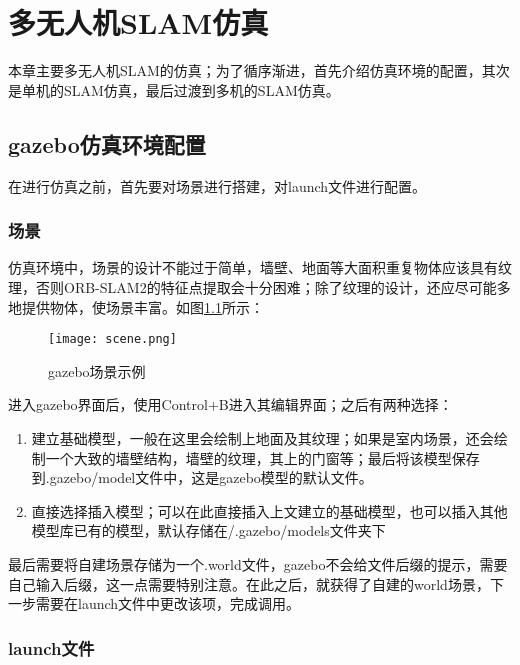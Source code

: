 \renewcommand{\baselinestretch}{1.5}
\fontsize{12pt}{13pt}\selectfont

\chapter{多无人机SLAM仿真} \label{Simulation}

本章主要多无人机SLAM的仿真；为了循序渐进，首先介绍仿真环境的配置，其次是单机的SLAM仿真，最后过渡到多机的SLAM仿真。


\section{gazebo仿真环境配置}

在进行仿真之前，首先要对场景进行搭建，对launch文件进行配置。

\subsection{场景} \label{4.1.1}

仿真环境中，场景的设计不能过于简单，墙壁、地面等大面积重复物体应该具有纹理，否则ORB-SLAM2的特征点提取会十分困难；除了纹理的设计，还应尽可能多地提供物体，使场景丰富。如图\ref{fig4-1}所示：
~\\
\begin{figure}[!ht]
	\centering
	\texttt{[image: scene.png]}
	\caption{gazebo场景示例}
	\label{fig4-1}
\end{figure}

进入gazebo界面后，使用Control+B进入其编辑界面；之后有两种选择：

\begin{enumerate}
	\item 建立基础模型，一般在这里会绘制上地面及其纹理；如果是室内场景，还会绘制一个大致的墙壁结构，墙壁的纹理，其上的门窗等；最后将该模型保存到.gazebo/model文件中，这是gazebo模型的默认文件。
	\item 直接选择插入模型；可以在此直接插入上文建立的基础模型，也可以插入其他模型库已有的模型，默认存储在/.gazebo/models文件夹下
\end{enumerate}

最后需要将自建场景存储为一个.world文件，gazebo不会给文件后缀的提示，需要自己输入后缀，这一点需要特别注意。在此之后，就获得了自建的world场景，下一步需要在launch文件中更改该项，完成调用。


\subsection{launch文件} \label{4.1.2}

